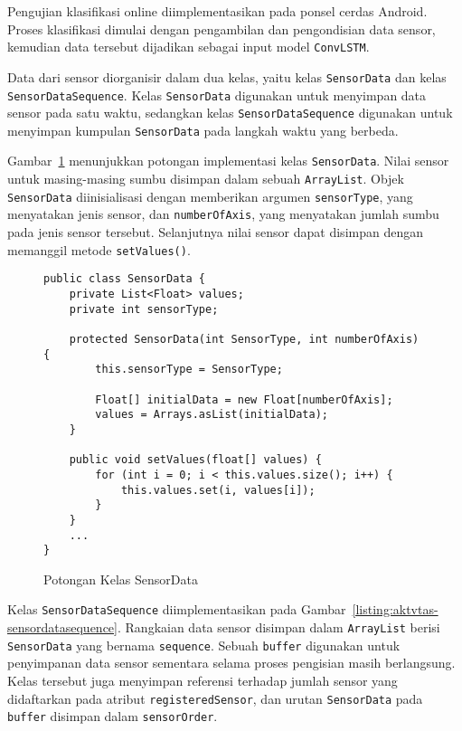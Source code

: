 Pengujian klasifikasi online diimplementasikan pada ponsel cerdas Android. Proses klasifikasi dimulai dengan pengambilan dan pengondisian data sensor, kemudian data tersebut dijadikan sebagai input model \texttt{ConvLSTM}.

Data dari sensor diorganisir dalam dua kelas, yaitu kelas \texttt{SensorData} dan kelas \texttt{SensorDataSequence}. Kelas \texttt{SensorData} digunakan untuk menyimpan data sensor pada satu waktu, sedangkan kelas \texttt{SensorDataSequence} digunakan untuk menyimpan kumpulan \texttt{SensorData} pada langkah waktu yang berbeda.

Gambar~\ref{listing:aktvtas-sensordata} menunjukkan potongan implementasi kelas \texttt{SensorData}. Nilai sensor untuk masing-masing sumbu disimpan dalam sebuah \texttt{ArrayList}. Objek \texttt{SensorData} diinisialisasi dengan memberikan argumen \texttt{sensorType}, yang menyatakan jenis sensor, dan \texttt{numberOfAxis}, yang menyatakan jumlah sumbu pada jenis sensor tersebut. Selanjutnya nilai sensor dapat disimpan dengan memanggil metode \texttt{setValues()}.

\begin{figure}[h]
\begin{verbatim}
public class SensorData {
    private List<Float> values;
    private int sensorType;

    protected SensorData(int SensorType, int numberOfAxis) {
        this.sensorType = SensorType;

        Float[] initialData = new Float[numberOfAxis];
        values = Arrays.asList(initialData);
    }

    public void setValues(float[] values) {
        for (int i = 0; i < this.values.size(); i++) {
            this.values.set(i, values[i]);
        }
    }
    ...
}
\end{verbatim}
\caption{Potongan Kelas SensorData}
\label{listing:aktvtas-sensordata}
\end{figure}

Kelas \texttt{SensorDataSequence} diimplementasikan pada Gambar~\ref{listing:aktvtas-sensordatasequence}. Rangkaian data sensor disimpan dalam \texttt{ArrayList} berisi \texttt{SensorData} yang bernama \texttt{sequence}. Sebuah \texttt{buffer} digunakan untuk penyimpanan data sensor sementara selama proses pengisian masih berlangsung. Kelas tersebut juga menyimpan referensi terhadap jumlah sensor yang didaftarkan pada atribut \texttt{registeredSensor}, dan urutan \texttt{SensorData} pada \texttt{buffer} disimpan dalam \texttt{sensorOrder}.

